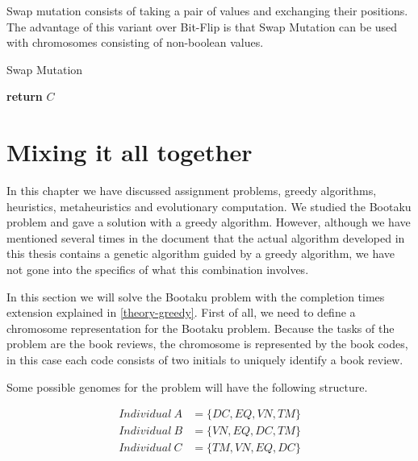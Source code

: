 Swap mutation consists of taking a pair of values and exchanging their positions. The advantage of this variant over Bit-Flip is that Swap Mutation can be used with chromosomes consisting of non-boolean values. 

\begin{algorithm}[H]
    \caption{Swap Mutation}
    \label{theory-ga-sm}
    \begin{algorithmic}[1]
            \EndWhile
            \State \textbf{return} $C$
        \EndProcedure
    \end{algorithmic}
\end{algorithm}



\section{Mixing it all together}

In this chapter we have discussed assignment problems, greedy algorithms, heuristics, metaheuristics and evolutionary computation. We studied the Bootaku problem and gave a solution with a greedy algorithm. However, although we have mentioned several times in the document that the actual algorithm developed in this thesis contains a genetic algorithm guided by a greedy algorithm, we have not gone into the specifics of what this combination involves.

In this section we will solve the Bootaku problem with the completion times extension explained in \ref{theory-greedy}. First of all, we need to define a chromosome representation for the Bootaku problem. Because the tasks of the problem are the book reviews, the chromosome is represented by the book codes, in this case each code consists of two initials to uniquely identify a book review.

Some possible genomes for the problem will have the following structure.

\begin{align}
    Individual\ A &= \{ DC, EQ, VN, TM \}\\
    Individual\ B &= \{ VN, EQ, DC, TM \}\\
    Individual\ C &= \{ TM, VN, EQ, DC \}
\end{align}

